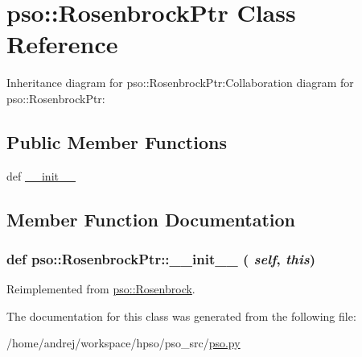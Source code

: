 \hypertarget{classpso_1_1RosenbrockPtr}{
\section{pso::RosenbrockPtr Class Reference}
\label{classpso_1_1RosenbrockPtr}
}
Inheritance diagram for pso::RosenbrockPtr:Collaboration diagram for pso::RosenbrockPtr:\subsection*{Public Member Functions}
\begin{CompactItemize}
\item 
def \hyperlink{classpso_1_1RosenbrockPtr_cd5936c5a86eae090b9b9d473e6fa87c}{\_\-\_\-init\_\-\_\-}
\end{CompactItemize}


\subsection{Member Function Documentation}
\hypertarget{classpso_1_1RosenbrockPtr_cd5936c5a86eae090b9b9d473e6fa87c}{
\subsubsection{\setlength{\rightskip}{0pt plus 5cm}def pso::RosenbrockPtr::\_\-\_\-init\_\-\_\- ( {\em self}, \/   {\em this})}}
\label{classpso_1_1RosenbrockPtr_cd5936c5a86eae090b9b9d473e6fa87c}




Reimplemented from \hyperlink{classpso_1_1Rosenbrock_10f77ae0f5c18274477e3102632b24f1}{pso::Rosenbrock}.

The documentation for this class was generated from the following file:\begin{CompactItemize}
\item 
/home/andrej/workspace/hpso/pso\_\-src/\hyperlink{pso_8py}{pso.py}\end{CompactItemize}
